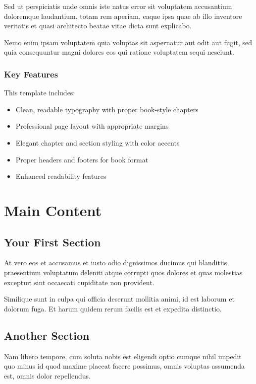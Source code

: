 \documentclass[11pt,twoside,openright,twocolumn]{book}
\begin{document}
Sed ut perspiciatis unde omnis iste natus error sit voluptatem accusantium doloremque laudantium, totam rem aperiam, eaque ipsa quae ab illo inventore veritatis et quasi architecto beatae vitae dicta sunt explicabo.

Nemo enim ipsam voluptatem quia voluptas sit aspernatur aut odit aut fugit, sed quia consequuntur magni dolores eos qui ratione voluptatem sequi nesciunt.

\subsection{Key Features}

This template includes:
\begin{itemize}
    \item Clean, readable typography with proper book-style chapters
    \item Professional page layout with appropriate margins
    \item Elegant chapter and section styling with color accents
    \item Proper headers and footers for book format
    \item Enhanced readability features
\end{itemize}

\chapter{Main Content}

\section{Your First Section}

At vero eos et accusamus et iusto odio dignissimos ducimus qui blanditiis praesentium voluptatum deleniti atque corrupti quos dolores et quas molestias excepturi sint occaecati cupiditate non provident.

Similique sunt in culpa qui officia deserunt mollitia animi, id est laborum et dolorum fuga. Et harum quidem rerum facilis est et expedita distinctio.

\section{Another Section}

Nam libero tempore, cum soluta nobis est eligendi optio cumque nihil impedit quo minus id quod maxime placeat facere possimus, omnis voluptas assumenda est, omnis dolor repellendus.
\end{document}
